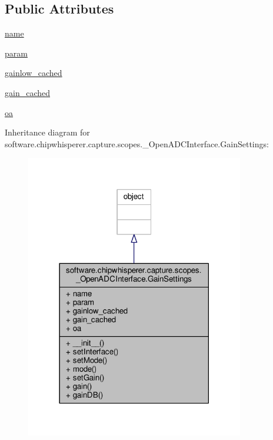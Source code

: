 \subsection*{Public Attributes}
\begin{DoxyCompactItemize}
\item 
\hyperlink{classsoftware_1_1chipwhisperer_1_1capture_1_1scopes_1_1__OpenADCInterface_1_1GainSettings_a821d43343196e49eea3fcd7ad2815af2}{name}
\item 
\hyperlink{classsoftware_1_1chipwhisperer_1_1capture_1_1scopes_1_1__OpenADCInterface_1_1GainSettings_ab2fbbbb1845ef81b590848f5580a1e19}{param}
\item 
\hyperlink{classsoftware_1_1chipwhisperer_1_1capture_1_1scopes_1_1__OpenADCInterface_1_1GainSettings_a3e63ec24ee836d894086be03fafab083}{gainlow\+\_\+cached}
\item 
\hyperlink{classsoftware_1_1chipwhisperer_1_1capture_1_1scopes_1_1__OpenADCInterface_1_1GainSettings_a1054d1e2bc90679afc51d51cfe30ca7a}{gain\+\_\+cached}
\item 
\hyperlink{classsoftware_1_1chipwhisperer_1_1capture_1_1scopes_1_1__OpenADCInterface_1_1GainSettings_ab4a1ae0c6f8dca94fee4757314a227bd}{oa}
\end{DoxyCompactItemize}


Inheritance diagram for software.\+chipwhisperer.\+capture.\+scopes.\+\_\+\+Open\+A\+D\+C\+Interface.\+Gain\+Settings\+:\nopagebreak
\begin{figure}[H]
\begin{center}
\leavevmode
\includegraphics[width=270pt]{d8/daa/classsoftware_1_1chipwhisperer_1_1capture_1_1scopes_1_1__OpenADCInterface_1_1GainSettings__inherit__graph}
\end{center}
\end{figure}


